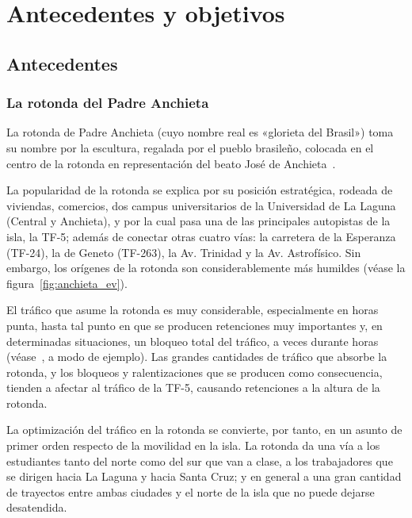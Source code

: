 \chapter{Antecedentes y objetivos}
\label{cap:2-antecedentes}

\section{Antecedentes}

\subsection{La rotonda del Padre Anchieta}

La rotonda de Padre Anchieta (cuyo nombre real es «glorieta del Brasil») toma su nombre por la escultura, regalada por el pueblo brasileño, colocada en el centro de la rotonda en representación del beato José de Anchieta~\cite{gallo_glorieta_2013}.

La popularidad de la rotonda se explica por su posición estratégica, rodeada de viviendas, comercios, dos campus universitarios de la Universidad de La Laguna (Central y Anchieta), y por la cual pasa una de las principales autopistas de la isla, la TF-5; además de conectar otras cuatro vías: la carretera de la Esperanza (TF-24), la de Geneto (TF-263), la Av. Trinidad y la Av. Astrofísico. Sin embargo, los orígenes de la rotonda son considerablemente más humildes (véase la figura~\ref{fig:anchieta_ev}).

El tráfico que asume la rotonda es muy considerable, especialmente en horas punta, hasta tal punto en que se producen retenciones muy importantes y, en determinadas situaciones, un bloqueo total del tráfico, a veces durante horas (véase~\cite{gulesserian_vuelven_2018}, a modo de ejemplo). Las grandes cantidades de tráfico que absorbe la rotonda, y los bloqueos y ralentizaciones que se producen como consecuencia, tienden a afectar al tráfico de la TF-5, causando retenciones a la altura de la rotonda.

La optimización del tráfico en la rotonda se convierte, por tanto, en un asunto de primer orden respecto de la movilidad en la isla. La rotonda da una vía a los estudiantes tanto del norte como del sur que van a clase, a los trabajadores que se dirigen hacia La Laguna y hacia Santa Cruz; y en general a una gran cantidad de trayectos entre ambas ciudades y el norte de la isla que no puede dejarse desatendida.

